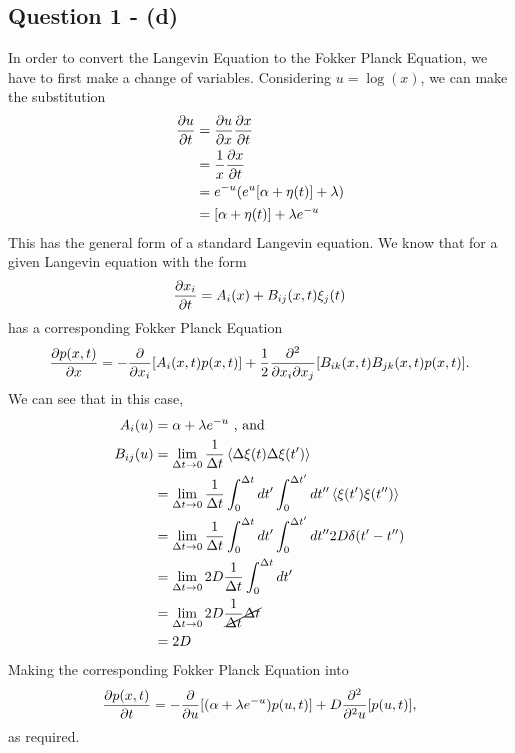 \documentclass[11pt,a4paper]{article}
\begin{document}
\subsection{Question 1 - (d)}
\label{sec:question1:subsec:partd}
In order to convert the Langevin Equation to the Fokker Planck Equation, we have to first make a change of variables. Considering $u = \log(x)$, we can make the substitution 
\begin{align*}
  \pdv{u}{t} &= \pdv{u}{x} \pdv{x}{t} \\
  &= \frac{1}{x} \pdv{x}{t} \\
  &= e^{-u} (e^u [\alpha + \eta(t)] + \lambda) \\
  &= [\alpha + \eta(t)] + \lambda e^{-u}
\end{align*} 
This has the general form of a standard Langevin equation. We know that for a given Langevin equation with the form 
\begin{equation}
  \label{eq:std_langevin}
  \pdv{x_i}{t} = A_i (x) + B_{ij}(x,t) \xi_j (t) 
\end{equation}
has a corresponding Fokker Planck Equation
\begin{equation}
  \label{eq:std_fkkrplnk}
  \pdv{p(x,t)}{x} = - \pdv{x_i} [A_i(x,t) p(x,t)] + \frac{1}{2}                 \frac{\partial^2}{\partial x_i \partial x_j} [B_{ik}(x,t) B_{jk} (x,t) p(x,t)].
\end{equation}
We can see that in this case, 
\begin{align*}
  A_i(u) &= \alpha + \lambda e^{-u} \text{ , and}\\
  B_{ij} (u) &= \lim_{\Delta t \rightarrow 0} \frac{1}{\Delta t} \left< \Delta \xi(t) \Delta \xi(t^\prime) \right> \\
  &= \lim_{\Delta t \rightarrow 0} \frac{1}{\Delta t} \int_0^{\Delta t} dt^\prime \int_0^{\Delta t^\prime} dt^{\prime \prime} \left< \xi(t^\prime) \xi(t^{\prime \prime}) \right> \\
  &= \lim_{\Delta t \rightarrow 0} \frac{1}{\Delta t} \int_0^{\Delta t} dt^\prime \int_0^{\Delta t^\prime} dt^{\prime \prime} 2 D \delta(t^\prime - t^{\prime \prime}) \\
  &= \lim_{\Delta t \rightarrow 0} 2 D \frac{1}{\Delta t} \int_0^{\Delta t} dt^\prime  \\
  &= \lim_{\Delta t \rightarrow 0} 2 D \frac{1}{\cancel{\Delta t}} \cancel{\Delta t}  \\
  &= 2D \\
\end{align*}
Making the corresponding Fokker Planck Equation into
\begin{equation}\label{eq:fkkr_plnck}
  \pdv{p(x,t)}{t} = - \pdv{u} [(\alpha + \lambda e^{-u}) p(u,t)] + D                 \frac{\partial^2}{\partial^2  u} [p(u,t)],
\end{equation}
as required.
\end{document}
